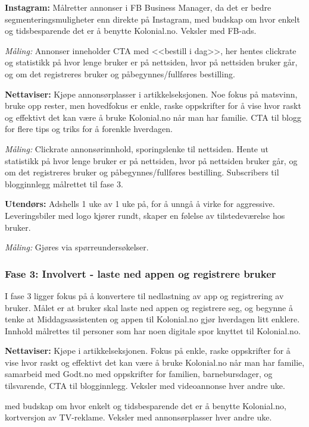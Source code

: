 \textbf{Instagram:} Målretter annonser i FB Business Manager, da det er bedre segmenteringsmuligheter enn direkte på Instagram, med budskap om hvor enkelt og tidsbesparende det er å benytte Kolonial.no. Veksler med FB-ads. 

\textit{Måling:} Annonser inneholder CTA med <<bestill i dag>>, her hentes clickrate og statistikk på hvor lenge bruker er på nettsiden, hvor på nettsiden bruker går, og om det registreres bruker og påbegynnes/fullføres bestilling. 

\textbf{Nettaviser:} Kjøpe annonsørplasser i artikkelseksjonen. Noe fokus på matsvinn, bruke opp rester, men hovedfokus er enkle, raske oppskrifter for å vise hvor raskt og effektivt det kan være å bruke Kolonial.no når man har familie. CTA til blogg for flere tips og triks for å forenkle hverdagen.  

\textit{Måling:} Clickrate annonsørinnhold, sporingslenke til nettsiden. Hente ut statistikk på hvor lenge bruker er på nettsiden, hvor på nettsiden bruker går, og om det registreres bruker og påbegynnes/fullføres bestilling. Subscribers til blogginnlegg målrettet til fase 3. 

\textbf{Utendørs:} Adshells 1 uke av 1 uke på, for å unngå å virke for aggressive. 
Leveringsbiler med logo kjører rundt, skaper en følelse av tilstedeværelse hos bruker.

\textit{Måling:} Gjøres via spørreundersøkelser.  

\subsubsection{\textbf{Fase 3: Involvert - laste ned appen og registrere bruker}}
I fase 3 ligger fokus på å konvertere til nedlastning av app og registrering av bruker. Målet er at bruker skal laste ned appen og registrere seg, og begynne å tenke at Middagsassistenten og appen til Kolonial.no gjør hverdagen litt enklere. Innhold målrettes til personer som har noen digitale spor knyttet til Kolonial.no. 

\textbf{Nettaviser:} Kjøpe  i artikkelseksjonen. Fokus på enkle, raske oppskrifter for å vise hvor raskt og effektivt det kan være å bruke Kolonial.no når man har familie, samarbeid med Godt.no med oppskrifter for familien, barnebursdager, og tilsvarende, CTA til blogginnlegg. Veksler med videoannonse hver andre uke. 

 med budskap om hvor enkelt og tidsbesparende det er å benytte Kolonial.no, kortversjon av TV-reklame. Veksler med annonsørplasser hver andre uke. 


